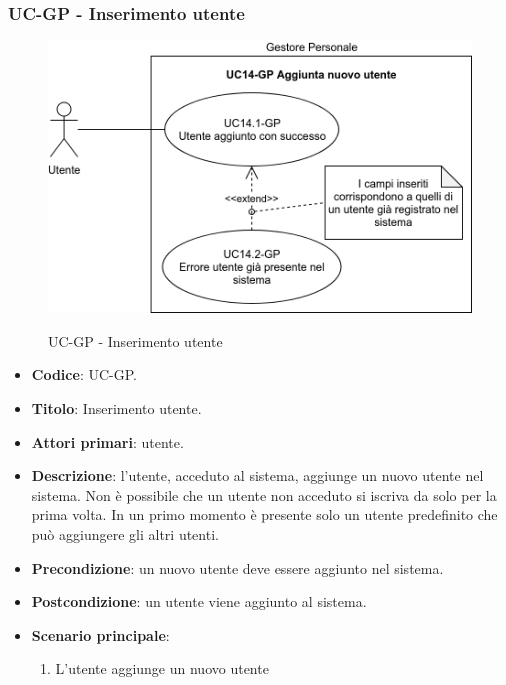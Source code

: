 \subsubsection{UC\theuccount-GP - Inserimento utente}
		\begin{figure}[H]
			\centering
				\includegraphics[width=\columnwidth]{img/casi_d'uso/UC14.png}\\
			\caption{UC\theuccount-GP - Inserimento utente}
		\end{figure}
	\begin{itemize}
		\item \textbf{Codice}: UC\theuccount-GP.
		\item \textbf{Titolo}: Inserimento utente.
		\item \textbf{Attori primari}: utente.
		\item \textbf{Descrizione}: l'utente, acceduto al sistema, aggiunge un nuovo utente nel sistema.
		Non è possibile che un utente non acceduto si iscriva da solo per la prima volta.
		In un primo momento è presente solo un utente predefinito che può aggiungere gli altri utenti.
		\item \textbf{Precondizione}: un nuovo utente deve essere aggiunto nel sistema.
		\item \textbf{Postcondizione}: un utente viene aggiunto al sistema.
		\item \textbf{Scenario principale}:
		\begin{enumerate}
			\item L'utente aggiunge un nuovo utente
		\end{enumerate}
	\end{itemize}
